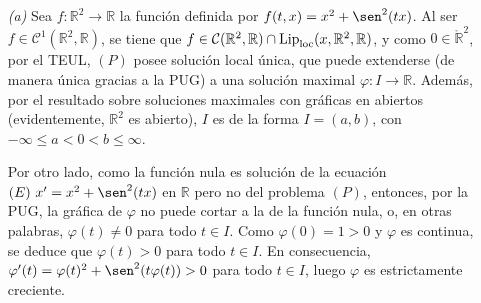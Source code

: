 \documentclass[11pt]{report}
\newcommand{\R}{\mathbb R}
\begin{document}
\begin{itemize}
    \item[\textit{(a)}] Sea $f\colon \R^2 \to \R$ la función definida por $f(t,x)=x^2+\sen^2(tx)$. Al ser $f \in \mathcal{C}^1(\R^2,\R)$, se tiene que $f \in \mathcal{C}(\R^2,\R)\cap \textup{Lip}_{\textup{loc}}(x,\R^2,\R)$, y como $0 \in \mathring{\R}^2$, por el TEUL, $(P)$ posee solución local única, que puede extenderse (de manera única gracias a la PUG) a una solución maximal $\varphi \colon I \to \R$. Además, por el resultado sobre soluciones maximales con gráficas en abiertos (evidentemente, $\R^2$ es abierto), $I$ es de la forma $I=(a,b)$, con $-\infty \leq a < 0 < b \leq \infty$.

    \vspace{2mm}

    Por otro lado, como la función nula es solución de la ecuación $(E) \ x'=x^2+\sen^2(tx)$ en $\R$ pero no del problema $(P)$, entonces, por la PUG, la gráfica de $\varphi$ no puede cortar a la de la función nula, o, en otras palabras, $\varphi(t) \neq 0$ para todo $t \in I$. Como $\varphi(0)=1 > 0$ y $\varphi$ es continua, se deduce que $\varphi(t) >0$ para todo $t \in I$. En consecuencia, $\varphi'(t)=\varphi(t)^2+\sen^2(t\varphi(t)) >0$ para todo $t \in I$, luego $\varphi$ es estrictamente creciente.


\end{itemize}
\end{document}
